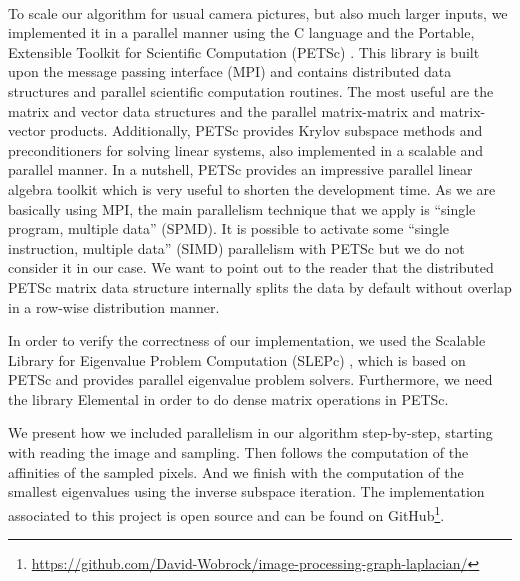 \paragraph{}
To scale our algorithm for usual camera pictures, but also much larger inputs, we implemented it in a parallel manner using the C language and the Portable, Extensible Toolkit for Scientific Computation (PETSc) \cite{petsc_web_page}.
This library is built upon the message passing interface (MPI) and contains distributed data structures and parallel scientific computation routines.
\ifthesis
 The most useful are the matrix and vector data structures and the parallel matrix-matrix and matrix-vector products.
 Additionally, PETSc provides Krylov subspace methods and preconditioners for solving linear systems, also implemented in a scalable and parallel manner.
\fi
In a nutshell, PETSc provides an impressive parallel linear algebra toolkit which is very useful to shorten the development time.
\ifthesis
 As we are basically using MPI, the main parallelism technique that we apply is ``single program, multiple data'' (SPMD).
 It is possible to activate some ``single instruction, multiple data'' (SIMD) parallelism with PETSc but we do not consider it in our case.
 We want to point out to the reader that the distributed PETSc matrix data structure internally splits the data by default without overlap in a row-wise distribution manner.
\fi

In order to verify the correctness of our implementation, we used the Scalable Library for Eigenvalue Problem Computation (SLEPc) \cite{hernandez_slepc_2005}, which is based on PETSc and provides parallel eigenvalue problem solvers.
Furthermore, we need the library Elemental \cite{poulson_elemental_2013} in order to do dense matrix operations in PETSc.

\ifthesis
 We present how we included parallelism in our algorithm step-by-step, starting with reading the image and sampling.
 Then follows the computation of the affinities of the sampled pixels.
 And we finish with the computation of the smallest eigenvalues using the inverse subspace iteration.
\fi
The implementation associated to this project is open source and can be found on GitHub\footnote{\url{https://github.com/David-Wobrock/image-processing-graph-laplacian/}}.

